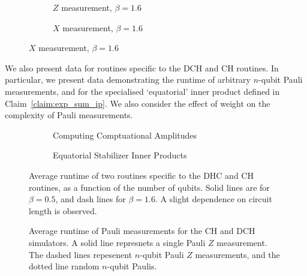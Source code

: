 \begin{figure}[p]
\begin{subfigure}[t]{0.42\textwidth}
\begin{scaletikzpicturetowidth}{\textwidth}
    \end{scaletikzpicturetowidth}
\end{subfigure}
\begin{subfigure}[t]{0.42\textwidth}
    \centering
    \caption{$Z$ measurement, $\beta=1.6$}
    \begin{scaletikzpicturetowidth}{\textwidth}
        
    \end{scaletikzpicturetowidth}
\end{subfigure}
\begin{subfigure}[t]{0.42\textwidth}
    \centering
    \caption{$X$ measurement, $\beta=1.6$}
    \begin{scaletikzpicturetowidth}{\textwidth}
        
    \end{scaletikzpicturetowidth}
\end{subfigure}
\end{figure}
We also present data for routines specific to the DCH and CH routines. In particular, we present data demonstrating the runtime of arbitrary $n$-qubit Pauli measurements, and for the specialised `equatorial' inner product defined in Claim~\ref{claim:exp_sum_ip}. We also consider the effect of weight on the complexity of Pauli measurements.
\begin{figure}[p]
\centering
\begin{subfigure}[t]{0.48\textwidth}
\centering
\caption{Computing Comptuational Amplitudes}
\label{fig:amp_comparison}
    \begin{scaletikzpicturetowidth}{\textwidth}
        
    \end{scaletikzpicturetowidth}
\end{subfigure}
\begin{subfigure}[t]{0.48\textwidth}
\centering
    \caption{Equatorial Stabilizer Inner Products}
    \label{fig:eq_ip_comparison}
    \begin{scaletikzpicturetowidth}{\textwidth}
        
    \end{scaletikzpicturetowidth}
\end{subfigure}
\caption{Average runtime of two routines specific to the DHC and CH routines, as a function of the number of qubits. Solid lines are for $\beta=0.5$, and dash lines for $\beta=1.6$. A slight dependence on circuit length is observed.}
\label{fig:other_routines}
\end{figure}
\begin{figure}[p]
\caption{Average runtime of Pauli measurements for the CH and DCH simulators. A solid line represnets a single Pauli $Z$ measurement. The dashed lines repesenent $n$-qubit Pauli $Z$ measurements, and the dotted line random $n$-qubit Paulis.}
\centering
\begin{scaletikzpicturetowidth}{0.75\textwidth}
    
\end{scaletikzpicturetowidth}
\label{fig:measurement_comparison}
\end{figure}
